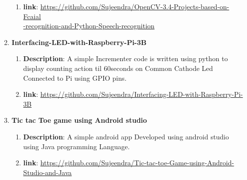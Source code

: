 \documentclass[12pt]{article}
\begin{document}
\begin{enumerate}[label*={\fontsize{13pt}{13pt}\selectfont \textbf{\textbf{\arabic*.}}}]
\begin{enumerate}
	\item {\fontsize{13pt}{15.6pt}\selectfont \textbf{link}: \href{https://github.com/Sujeendra/OpenCV-3.4-Projects-based-on-Fcaial-recognition-and-Python-Speech-recognition}{https://github.com/Sujeendra/OpenCV-3.4-Projects-based-on-Fcaial\\-recognition-and-Python-Speech-recognition}\par}\end{enumerate}\par


\vspace{0.01cm}

\vspace{0.1cm}
	\item {\fontsize{13pt}{15.6pt}\selectfont \textbf{Interfacing-LED-with-Raspberry-Pi-3B}\par}\par
\begin{enumerate}
	\item {\fontsize{13pt}{15.6pt}\selectfont \textbf{Description}: A simple Incrementer code is written using python to display counting action til 60seconds on Common Cathode Led Connected to Pi using GPIO pins.\par}\par

	\item {\fontsize{13pt}{15.6pt}\selectfont \textbf{link}: \href{https://github.com/Sujeendra/Interfacing-LED-with-Raspberry-Pi-3B}{https://github.com/Sujeendra/Interfacing-LED-with-Raspberry-Pi-3B}\par}\end{enumerate}\par


\vspace{0.1cm}
	\item {\fontsize{13pt}{15.6pt}\selectfont \textbf{Tic tac Toe game using Android studio }\par}

\begin{enumerate}
	\item {\fontsize{13pt}{15.6pt}\selectfont \textbf{Description}: A simple android app Developed using android studio using Java programming Language.\par}\par

	\item {\fontsize{13pt}{15.6pt}\selectfont \textbf{link}: \href{https://github.com/Sujeendra/Tic-tac-toe-Game-using-Android-Studio-and-Java}{https://github.com/Sujeendra/Tic-tac-toe-Game-using-Android-Studio-and-Java}\par}\end{enumerate}\par



\end{enumerate}
\end{document}
